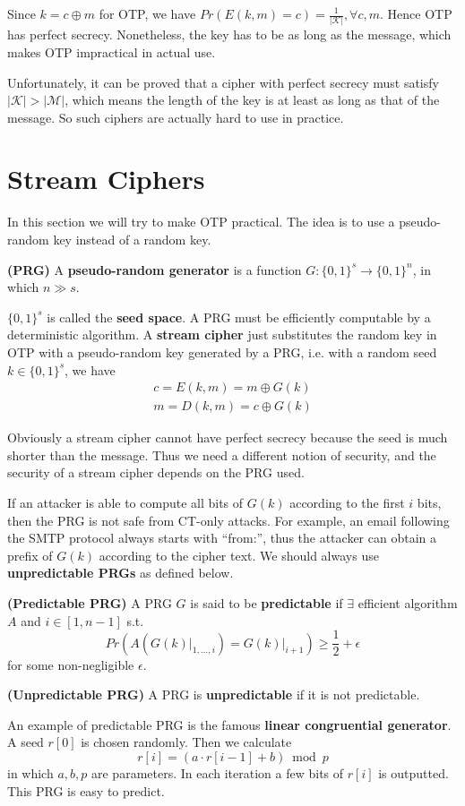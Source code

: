 Since $k=c\oplus m$ for OTP, we have $Pr(E(k,m)=c)=\frac{1}{\lvert\mathcal{K}\rvert},\forall c,m$. Hence OTP has perfect secrecy. Nonetheless, the key has to be as long as the message, which makes OTP impractical in actual use. 

Unfortunately, it can be proved that a cipher with perfect secrecy must satisfy $\lvert\mathcal{K}\rvert>\lvert\mathcal{M}\rvert$, which means the length of the key is at least as long as that of the message. So such ciphers are actually hard to use in practice.
\section{Stream Ciphers}
In this section we will try to make OTP practical. The idea is to use a pseudo-random key instead of a random key. 
\begin{definition}\textbf{(PRG)}
A \textbf{pseudo-random generator} is a function $G:\{0,1\}^s\rightarrow\{0,1\}^n$, in which $n\gg s$. 
\end{definition}
$\{0,1\}^s$ is called the \textbf{seed space}. A PRG must be efficiently computable by a deterministic algorithm. A \textbf{stream cipher} just substitutes the random key in OTP with a pseudo-random key generated by a PRG, i.e. with a random seed $k\in\{0,1\}^s$, we have
\begin{align*}
c=E(k,m)=m\oplus G(k)\\
m=D(k,m)=c\oplus G(k)
\end{align*}

Obviously a stream cipher cannot have perfect secrecy because the seed is much shorter than the message. Thus we need a different notion of security, and the security of a stream cipher depends on the PRG used. 

If an attacker is able to compute all bits of $G(k)$ according to the first $i$ bits, then the PRG is not safe from CT-only attacks. For example, an email following the SMTP protocol always starts with ``from:'', thus the attacker can obtain a prefix of $G(k)$ according to the cipher text. We should always use \textbf{unpredictable PRGs} as defined below.
\begin{definition}\textbf{(Predictable PRG)}
A PRG $G$ is said to be \textbf{predictable} if $\exists$ efficient algorithm $A$ and $i\in[1,n-1]$ s.t. 
\begin{equation*}
Pr\left(A\left(\left.G(k)\right\vert_{1,\dots,i}\right)=\left.G(k)\right\vert_{i+1}\right)\geq\frac{1}{2}+\epsilon
\end{equation*}
for some non-negligible $\epsilon$. 
\end{definition}
\begin{definition}\textbf{(Unpredictable PRG)}
A PRG is \textbf{unpredictable} if it is not predictable. 
\end{definition}
An example of predictable PRG is the famous \textbf{linear congruential generator}. A seed $r[0]$ is chosen randomly. Then we calculate
\begin{equation*}
r[i]=(a\cdot r[i-1]+b)\bmod p
\end{equation*}
in which $a,b,p$ are parameters. In each iteration a few bits of $r[i]$ is outputted. This PRG is easy to predict. 

